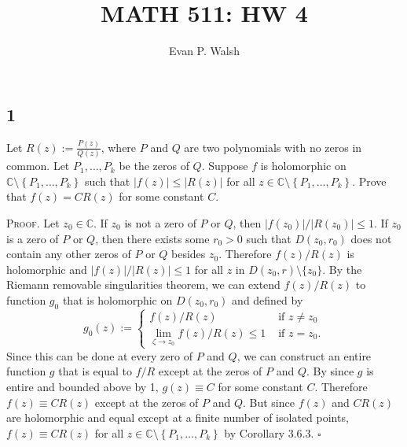 \documentclass[12pt]{article}
\title{MATH 511: HW 4}
\author{Evan P. Walsh}
\newcounter{ProofCounter}
\newenvironment{Proof}{\stepcounter{ProofCounter}\textsc{Proof.}}{\hfill$\square$}
\begin{document}
\maketitle

\subsection*{1}
\begin{tcolorbox}
Let $R(z) := \frac{P(z)}{Q(z)}$, where $P$ and $Q$ are two polynomials with no zeros in common. Let $P_1, \hdots, P_k$ be the zeros of $Q$. Suppose
$f$ is holomorphic on $\mathbb{C} \setminus \left\{ P_1, \hdots, P_k \right\}$ such that $|f(z)| \leq |R(z)|$ for all $z \in \mathbb{C} \setminus
\left\{ P_1,\hdots, P_k \right\}$. Prove that $f(z) = CR(z)$ for some constant $C$.
\end{tcolorbox}
\begin{Proof}
Let $z_0 \in \mathbb{C}$. If $z_0$ is not a zero of $P$ or $Q$, then $|f(z_0)| / |R(z_0)| \leq 1$. If $z_0$ is a zero of $P$ or $Q$, 
then there exists some $r_0 > 0$ such that $D(z_0,r_0)$ does not contain any other zeros of $P$ or $Q$ besides $z_0$. Therefore $f(z) / R(z)$ is
holomorphic and $|f(z)| / |R(z)| \leq 1$ for all $z$ in $D(z_0, r) \setminus \{z_0\}$. By the Riemann removable singularities theorem, we can extend
$f(z) / R(z)$ to function $g_0$ that is holomorphic on $D(z_0, r_0)$ and defined by 
\[ g_0(z) := \left\{ \begin{array}{cl}
f(z) / R(z) & \text{ if } z \neq z_0 \\
\lim_{\zeta\rightarrow z_0} f(z) / R(z) \leq 1 & \text{ if } z = z_0. 
\end{array} \right. \]
Since this can be done at every zero of $P$ and $Q$, we can construct an entire function $g$ that is equal to $f / R$ except at the zeros of $P$ and
$Q$. By since $g$ is entire and bounded above by 1, $g(z) \equiv C$ for some constant $C$. Therefore $f(z) \equiv CR(z)$ except at the zeros of $P$
and $Q$. But since $f(z)$ and $CR(z)$ are holomorphic and equal except at a finite number of isolated points, $f(z) \equiv CR(z)$ for all $z \in \mathbb{C}
\setminus \left\{ P_1,\hdots, P_k \right\}$ by Corollary 3.6.3.
\end{Proof}

\newpage
\end{document}
